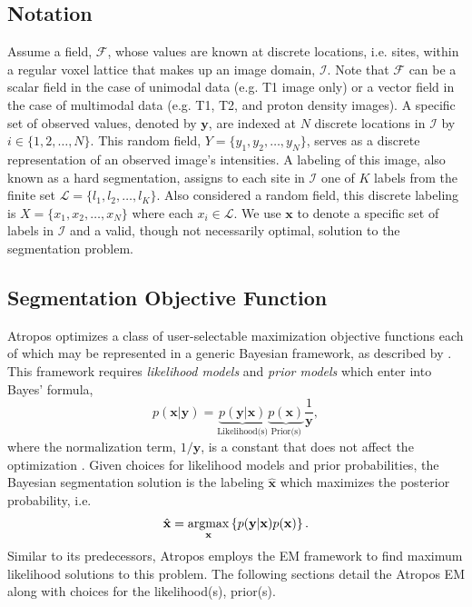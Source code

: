 \documentclass[11pt,english]{article}
\newcommand{\argmax}{\operatornamewithlimits{argmax}}
\begin{document}
\subsection{Notation}
Assume a field, $\mathcal{F}$, whose values are known at discrete
locations, i.e. sites, within a regular voxel lattice that makes up an
image domain, $\mathcal{I}$.  Note that $\mathcal{F}$ can be a scalar
field in the case of unimodal data (e.g. T1 image only) or a vector
field in the case of multimodal data (e.g. T1, T2, and proton density
images).  A specific set of observed values, denoted by $\mathbf{y}$,
are indexed at $N$ discrete locations in $\mathcal{I}$ by $i \in \{1,
2, \ldots, N\}$.  This random field, $Y = \{y_1, y_2, \ldots, y_N \}$,
serves as a discrete representation of an observed image's intensities.  A labeling
of this image, also known as a hard segmentation, assigns to each site
in $\mathcal{I}$ one of $K$ labels from the finite set $\mathcal{L} =
\{l_1, l_2, \ldots, l_K\}$.  Also considered a random field, this
discrete labeling is $X = \{x_1, x_2, \ldots, x_N\}$ where each
$x_i \in \mathcal{L}$.   We use $\mathbf{x}$ to denote a specific set of labels in
$\mathcal{I}$ and a valid, though not necessarily optimal, solution to the segmentation problem.


\subsection{Segmentation Objective Function} Atropos optimizes a class
of user-selectable maximization objective functions each of which may
be represented in a generic Bayesian framework, as described by \cite{Sanjay-Gopal1998}.  This framework
requires {\em likelihood models} and {\em prior models} which enter
into Bayes' formula,
\begin{equation}\label{eq:bayes}
p(\mathbf{x}|\mathbf{y})=\underbrace{
p(\mathbf{y}|\mathbf{x})}_{\text{Likelihood(s)}} \underbrace{
p(\mathbf{x})}_{\text{Prior(s)}}\frac{1}{\mathbf{y}}, 
\end{equation} 
where the normalization term, $1/\mathbf{y}$, is a constant that does
not affect the optimization \citep{Sanjay-Gopal1998}.
Given choices for likelihood models and prior probabilities, the Bayesian
segmentation solution is the labeling $\hat{\mathbf{x}}$ which
maximizes the posterior probability, i.e.
\begin{align} \hat{\mathbf{x}} = \argmax_{\mathbf{x}}
\left\{p(\mathbf{y}|\mathbf{x})p(\mathbf{x})\right\}.
\end{align} Similar to its predecessors, Atropos employs
the EM framework \citep{Dempster1977} to find maximum likelihood
solutions to this problem.  The following sections detail the 
Atropos EM along with choices for the likelihood(s), prior(s).  
\end{document}

